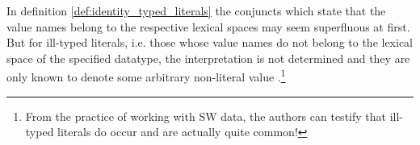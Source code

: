 In definition \ref{def:identity_typed_literals}
  the conjuncts which state that the value names belong to
  the respective lexical spaces may seem superfluous at first.
But for ill-typed literals,
  i.e. those whose value names do not belong to the lexical space of
  the specified datatype,
  the interpretation is not determined and they are only known to denote
  some arbitrary non-literal value \cite{Hayes2004}.\footnote{
    From the practice of working with SW data, the authors can testify
    that ill-typed literals do occur and are actually quite common!}

